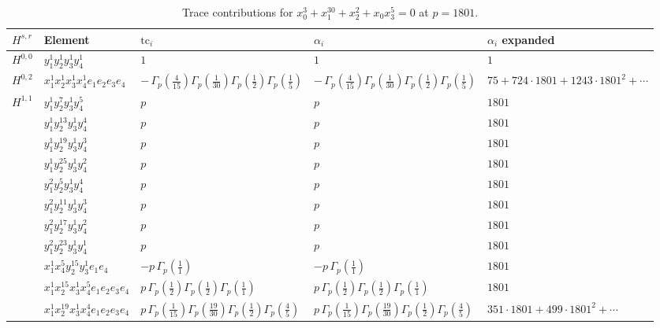 \documentclass[11pt]{article}
\begin{document}
\begin{table}[ht]
\centering
\caption{Trace contributions for $x_0^{3} + x_1^{30} + x_2^{2} + x_0 x_3^{5} = 0$ at $p=1801$.}\label{tab:deformed-70}
\renewcommand{\arraystretch}{1.1}
{\scriptsize
\begin{tabular}{@{}lllll@{}}
\toprule
$H^{s,r}$ & Element & $\mathrm{tc}_i$ & $\alpha_i$ & $\alpha_i$ expanded \\
\midrule
$H^{0,0}$ & $y_{1}^{1} y_{2}^{1} y_{3}^{1} y_{4}^{1}$ & $1$ & $1$ & $1$ \\
\midrule
$H^{0,2}$ & $x_{1}^{1} x_{2}^{1} x_{3}^{1} x_{4}^{1}  e_{1} e_{2} e_{3} e_{4}$ & $- \, \Gamma_p \left( \frac{4}{15} \right) \Gamma_p \left( \frac{1}{30} \right) \Gamma_p \left( \frac{1}{2} \right) \Gamma_p \left( \frac{1}{5} \right)$ & $- \, \Gamma_p \left( \frac{4}{15} \right) \Gamma_p \left( \frac{1}{30} \right) \Gamma_p \left( \frac{1}{2} \right) \Gamma_p \left( \frac{1}{5} \right)$ & $75{+}724{\cdot}1801{+}1243{\cdot}1801^{2}{+}\cdots$ \\
\midrule
$H^{1,1}$ & $y_{1}^{1} y_{2}^{7} y_{3}^{1} y_{4}^{5}$ & $p \,$ & $p \,$ & $1801$ \\
 & $y_{1}^{1} y_{2}^{13} y_{3}^{1} y_{4}^{4}$ & $p \,$ & $p \,$ & $1801$ \\
 & $y_{1}^{1} y_{2}^{19} y_{3}^{1} y_{4}^{3}$ & $p \,$ & $p \,$ & $1801$ \\
 & $y_{1}^{1} y_{2}^{25} y_{3}^{1} y_{4}^{2}$ & $p \,$ & $p \,$ & $1801$ \\
 & $y_{1}^{2} y_{2}^{5} y_{3}^{1} y_{4}^{4}$ & $p \,$ & $p \,$ & $1801$ \\
 & $y_{1}^{2} y_{2}^{11} y_{3}^{1} y_{4}^{3}$ & $p \,$ & $p \,$ & $1801$ \\
 & $y_{1}^{2} y_{2}^{17} y_{3}^{1} y_{4}^{2}$ & $p \,$ & $p \,$ & $1801$ \\
 & $y_{1}^{2} y_{2}^{23} y_{3}^{1} y_{4}^{1}$ & $p \,$ & $p \,$ & $1801$ \\
 & $x_{1}^{1} x_{4}^{5} y_{2}^{15} y_{3}^{1} e_{1} e_{4}$ & $- p \, \Gamma_p \left( \frac{1}{1} \right)$ & $- p \, \Gamma_p \left( \frac{1}{1} \right)$ & $1801$ \\
 & $x_{1}^{1} x_{2}^{15} x_{3}^{1} x_{4}^{5}  e_{1} e_{2} e_{3} e_{4}$ & $p \, \Gamma_p \left( \frac{1}{2} \right) \Gamma_p \left( \frac{1}{2} \right) \Gamma_p \left( \frac{1}{1} \right)$ & $p \, \Gamma_p \left( \frac{1}{2} \right) \Gamma_p \left( \frac{1}{2} \right) \Gamma_p \left( \frac{1}{1} \right)$ & $1801$ \\
 & $x_{1}^{1} x_{2}^{19} x_{3}^{1} x_{4}^{4}  e_{1} e_{2} e_{3} e_{4}$ & $p \, \Gamma_p \left( \frac{1}{15} \right) \Gamma_p \left( \frac{19}{30} \right) \Gamma_p \left( \frac{1}{2} \right) \Gamma_p \left( \frac{4}{5} \right)$ & $p \, \Gamma_p \left( \frac{1}{15} \right) \Gamma_p \left( \frac{19}{30} \right) \Gamma_p \left( \frac{1}{2} \right) \Gamma_p \left( \frac{4}{5} \right)$ & $351{\cdot}1801{+}499{\cdot}1801^{2}{+}\cdots$ \\

\end{tabular}}
\end{table}
\end{document}
